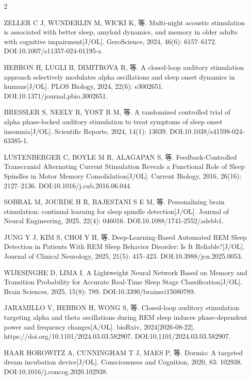 \documentclass[UTF8,zihao=5,fontset=none]{ctexart}
\begin{document}
\begin{multicols}{2}
{\makebox[25.2pt][l]{[85]}ZELLER C J, WUNDERLIN M, WICKI K, 等. Multi-night acoustic stimulation is associated with better sleep, amyloid dynamics, and memory in older adults with cognitive impairment[J/OL]. GeroScience, 2024, 46(6): 6157--6172. DOI:10.1007/s11357-024-01195-z.\par
\makebox[25.2pt][l]{[86]}HEBRON H, LUGLI B, DIMITROVA R, 等. A closed-loop auditory stimulation approach selectively modulates alpha oscillations and sleep onset dynamics in humans[J/OL]. PLOS Biology, 2024, 22(6): e3002651. DOI:10.1371/journal.pbio.3002651.\par
\makebox[25.2pt][l]{[87]}BRESSLER S, NEELY R, YOST R M, 等. A randomized controlled trial of alpha phase-locked auditory stimulation to treat symptoms of sleep onset insomnia[J/OL]. Scientific Reports, 2024, 14(1): 13039. DOI:10.1038/s41598-024-63385-1.\par
\makebox[25.2pt][l]{[88]}LUSTENBERGER C, BOYLE M R, ALAGAPAN S, 等. Feedback-Controlled Transcranial Alternating Current Stimulation Reveals a Functional Role of Sleep Spindles in Motor Memory Consolidation[J/OL]. Current Biology, 2016, 26(16): 2127--2136. DOI:10.1016/j.cub.2016.06.044.\par
\makebox[25.2pt][l]{[89]}SOBRAL M, JOURDE H R, BAJESTANI S E M, 等. Personalizing brain stimulation: continual learning for sleep spindle detection[J/OL]. Journal of Neural Engineering, 2025, 22(4): 046016. DOI:10.1088/1741-2552/adebb1.\par
\makebox[25.2pt][l]{[90]}JUNG Y J, KIM S, CHOI Y H, 等. Deep-Learning-Based Automated REM Sleep Detection in Patients With REM Sleep Behavior Disorder: Is It Reliable?[J/OL]. Journal of Clinical Neurology, 2025, 21(5): 415--423. DOI:10.3988/jcn.2025.0053.\par
\makebox[25.2pt][l]{[91]}WIJESINGHE D, LIMA I. A Lightweight Neural Network Based on Memory and Transition Probability for Accurate Real-Time Sleep Stage Classification[J/OL]. Brain Sciences, 2025, 15(8): 789. DOI:10.3390/brainsci15080789.\par
\makebox[25.2pt][l]{[92]}JARAMILLO V, HEBRON H, WONG S, 等. Closed-loop auditory stimulation targeting alpha and theta oscillations during REM sleep induces phase-dependent power and frequency changes[A/OL]. bioRxiv, 2024[2026-08-22]. https://doi.org/10.1101/2024.03.03.582907. DOI:10.1101/2024.03.03.582907.\par
\makebox[25.2pt][l]{[93]}HAAR HOROWITZ A, CUNNINGHAM T J, MAES P, 等. Dormio: A targeted dream incubation device[J/OL]. Consciousness and Cognition, 2020, 83: 102938. DOI:10.1016/j.concog.2020.102938.\par
}
\end{multicols}
\end{document}
